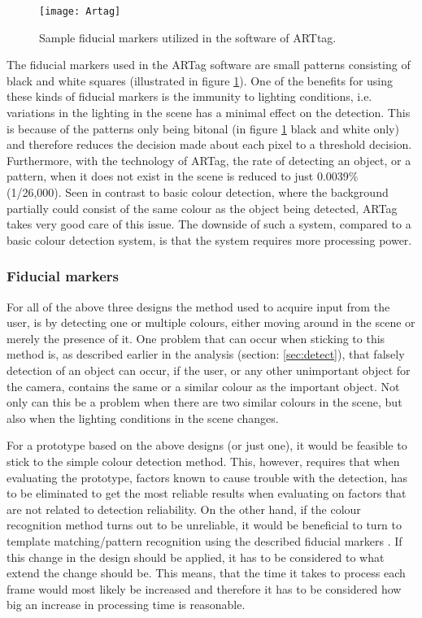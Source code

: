 \begin{figure}[h]
\centering
\texttt{[image: Artag]}
\caption{Sample fiducial markers utilized in the software of ARTtag. \parencite{Fiala2005}}
\label{fig:artag}
\end{figure}

The fiducial markers used in the ARTag software are small patterns consisting of black and white squares (illustrated in figure \ref{fig:artag}).
One of the benefits for using these kinds of fiducial markers is the immunity to lighting conditions, i.e. variations in the lighting in the scene has a minimal effect on the detection. This is because of the patterns only being bitonal (in figure \ref{fig:artag} black and white only) and therefore reduces the decision made about each pixel to a threshold decision. 
Furthermore, with the technology of ARTag, the rate of detecting an object, or a pattern, when it does not exist in the scene is reduced to just 0.0039\% (1/26,000).
Seen in contrast to basic colour detection, where the background partially could consist of the same colour as the object being detected, ARTag takes very good care of this issue. The downside of such a system, compared to a basic colour detection system, is that the system requires more processing power.


\subsubsection{Fiducial markers}
For all of the above three designs the method used to acquire input from the user, is by detecting one or multiple colours, either moving around in the scene or merely the presence of it.  One problem that can occur when sticking to this method is, as described earlier in the analysis (section: \ref{sec:detect}), that falsely detection of an object can occur, if the user, or any other unimportant object for the camera, contains the same or a similar colour as the important object. Not only can this be a problem when there are two similar colours in the scene, but also when the lighting conditions in the scene changes.
\bigskip

For a prototype based on the above designs (or just one), it would be feasible to stick to the simple colour detection method. This, however, requires that when evaluating the prototype, factors known to cause trouble with the detection, has to be eliminated to get the most reliable results when evaluating on factors that are not related to detection reliability. On the other hand, if the colour recognition method turns out to be unreliable, it would be beneficial to turn to template matching/pattern recognition using the described fiducial markers \parencite{Fiala2005}. If this change in the design should be applied, it has to be considered to what extend the change should be. This means, that the time it takes to process each frame would most likely be increased and therefore it has to be considered how big an increase in processing time is reasonable.

